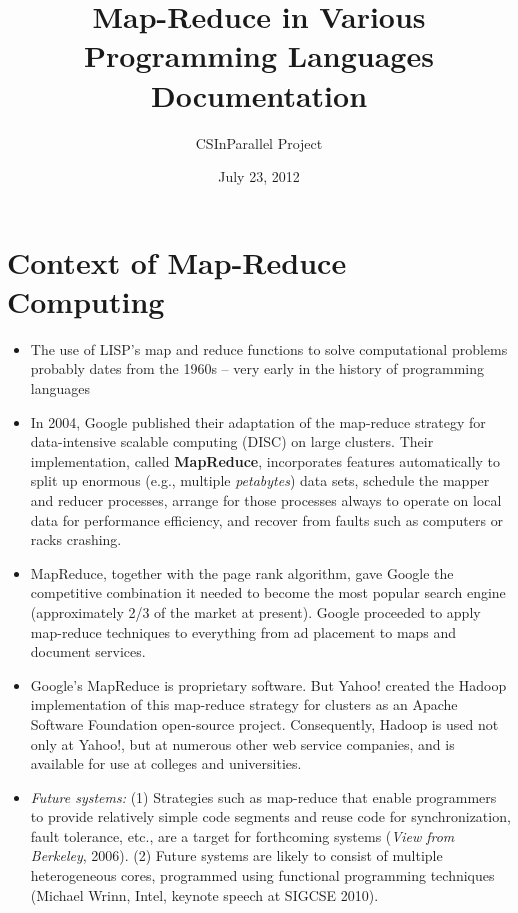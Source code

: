 \documentclass[letterpaper,10pt,openany,oneside]{sphinxmanual}
\title{Map-Reduce in Various Programming Languages Documentation}
\date{July 23, 2012}
\author{CSInParallel Project}
\begin{document}
\maketitle
\tableofcontents
{}\label{index::doc}



\chapter{Context of Map-Reduce Computing}
\label{Context/Context:context-of-map-reduce-computing}\label{Context/Context::doc}\label{Context/Context:map-reduce-in-various-programming-languages}\begin{itemize}
\item {} 
The use of LISP's map and reduce functions to solve computational problems probably dates from the 1960s -- very early in the history of programming languages

\item {} 
In 2004, Google published their adaptation of the map-reduce strategy for data-intensive scalable computing (DISC) on large clusters. Their implementation, called \textbf{MapReduce}, incorporates features automatically to split up enormous (e.g., multiple \emph{petabytes}) data sets, schedule the mapper and reducer processes, arrange for those processes always to operate on local data for performance efficiency, and recover from faults such as computers or racks crashing.

\item {} 
MapReduce, together with the page rank algorithm, gave Google the competitive combination it needed to become the most popular search engine (approximately 2/3 of the market at present). Google proceeded to apply map-reduce techniques to everything from ad placement to maps and document services.

\item {} 
Google's MapReduce is proprietary software. But Yahoo! created the Hadoop implementation of this map-reduce strategy for clusters as an Apache Software Foundation open-source project. Consequently, Hadoop is used not only at Yahoo!, but at numerous other web service companies, and is available for use at colleges and universities.

\item {} 
\emph{Future systems:} (1) Strategies such as map-reduce that enable programmers to provide relatively simple code segments and reuse code for synchronization, fault tolerance, etc., are a target for forthcoming systems (\emph{View from Berkeley}, 2006). (2) Future systems are likely to consist of multiple heterogeneous cores, programmed using functional programming techniques (Michael Wrinn, Intel, keynote speech at SIGCSE 2010).

\end{itemize}
\end{document}

